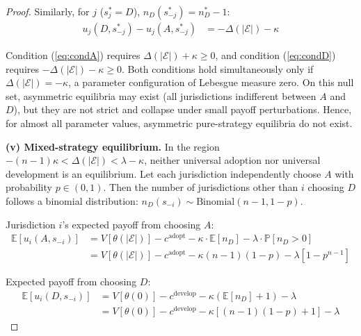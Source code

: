 \documentclass[12pt,a4paper]{article}
\theoremstyle{definition}
\theoremstyle{remark}
\begin{document}
\begin{proof}
Similarly, for $j$ ($s_j^* = D$), $n_D(s_{-j}^*) = n_D^* - 1$:
\begin{align}
u_j(D, s_{-j}^*) - u_j(A, s_{-j}^*) &= -\Delta(|\mathcal{E}|) - \kappa
\end{align}

Condition (\ref{eq:condA}) requires $\Delta(|\mathcal{E}|) + \kappa \geq 0$, and condition (\ref{eq:condD}) requires $-\Delta(|\mathcal{E}|) - \kappa \geq 0$. Both conditions hold simultaneously only if $\Delta(|\mathcal{E}|) = -\kappa$, a parameter configuration of Lebesgue measure zero. On this null set, asymmetric equilibria may exist (all jurisdictions indifferent between $A$ and $D$), but they are not strict and collapse under small payoff perturbations. Hence, for almost all parameter values, asymmetric pure-strategy equilibria do not exist.

\textbf{(v) Mixed-strategy equilibrium.} In the region $-(n-1)\kappa < \Delta(|\mathcal{E}|) < \lambda - \kappa$, neither universal adoption nor universal development is an equilibrium. Let each jurisdiction independently choose $A$ with probability $p \in (0,1)$. Then the number of jurisdictions other than $i$ choosing $D$ follows a binomial distribution: $n_D(s_{-i}) \sim \text{Binomial}(n-1, 1-p)$.

Jurisdiction $i$'s expected payoff from choosing $A$:
\begin{align}
\mathbb{E}[u_i(A, s_{-i})] &= V[\theta(|\mathcal{E}|)] - c^{\text{adopt}} - \kappa \cdot \mathbb{E}[n_D] - \lambda \cdot \mathbb{P}[n_D > 0] \nonumber\\
&= V[\theta(|\mathcal{E}|)] - c^{\text{adopt}} - \kappa (n-1)(1-p) - \lambda\left[1 - p^{n-1}\right]
\end{align}

Expected payoff from choosing $D$:
\begin{align}
\mathbb{E}[u_i(D, s_{-i})] &= V[\theta(0)] - c^{\text{develop}} - \kappa(\mathbb{E}[n_D] + 1) - \lambda \nonumber\\
&= V[\theta(0)] - c^{\text{develop}} - \kappa[(n-1)(1-p) + 1] - \lambda
\end{align}


\end{proof}
\end{document}
